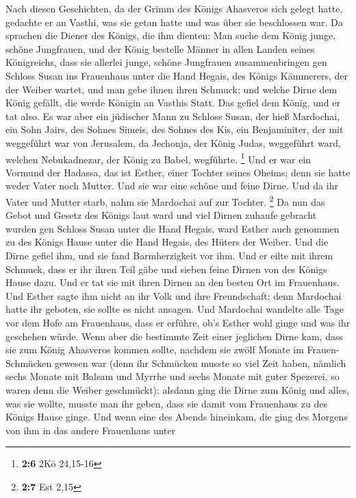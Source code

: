  Nach diesen Geschichten, da der Grimm des Königs Ahasveros
sich gelegt hatte, gedachte er an Vasthi, was sie getan hatte und was
über sie beschlossen war.  Da sprachen die Diener des
Königs, die ihm dienten: Man suche dem König junge, schöne Jungfrauen,
 und der König bestelle Männer in allen Landen seines
Königreichs, dass sie allerlei junge, schöne Jungfrauen zusammenbringen
gen Schloss Susan ins Frauenhaus unter die Hand Hegais, des Königs
Kämmerers, der der Weiber wartet, und man gebe ihnen ihren Schmuck;
 und welche Dirne dem König gefällt, die werde Königin an
Vasthis Statt. Das gefiel dem König, und er tat also.  Es
war aber ein jüdischer Mann zu Schloss Susan, der hieß Mardochai, ein
Sohn Jairs, des Sohnes Simeis, des Sohnes des Kis, ein Benjaminiter,
 der mit weggeführt war von Jerusalem, da Jechonja, der
König Judas, weggeführt ward, welchen Nebukadnezar, der König zu Babel,
wegführte. \footnote{\textbf{2:6} 2Kö 24,15-16}  Und er war
ein Vormund der Hadassa, das ist Esther, einer Tochter seines Oheims;
denn sie hatte weder Vater noch Mutter. Und sie war eine schöne und
feine Dirne. Und da ihr Vater und Mutter starb, nahm sie Mardochai auf
zur Tochter. \footnote{\textbf{2:7} Est 2,15}  Da nun das
Gebot und Gesetz des Königs laut ward und viel Dirnen zuhaufe gebracht
wurden gen Schloss Susan unter die Hand Hegais, ward Esther auch
genommen zu des Königs Hause unter die Hand Hegais, des Hüters der
Weiber.  Und die Dirne gefiel ihm, und sie fand
Barmherzigkeit vor ihm. Und er eilte mit ihrem Schmuck, dass er ihr
ihren Teil gäbe und sieben feine Dirnen von des Königs Hause dazu. Und
er tat sie mit ihren Dirnen an den besten Ort im Frauenhaus.
 Und Esther sagte ihm nicht an ihr Volk und ihre
Freundschaft; denn Mardochai hatte ihr geboten, sie sollte es nicht
ansagen.  Und Mardochai wandelte alle Tage vor dem Hofe am
Frauenhaus, dass er erführe, ob's Esther wohl ginge und was ihr
geschehen würde.  Wenn aber die bestimmte Zeit einer
jeglichen Dirne kam, dass sie zum König Ahasveros kommen sollte, nachdem
sie zwölf Monate im Frauen-Schmücken gewesen war (denn ihr Schmücken
musste so viel Zeit haben, nämlich sechs Monate mit Balsam und Myrrhe
und sechs Monate mit guter Spezerei, so waren denn die Weiber
geschmückt):  alsdann ging die Dirne zum König und alles,
was sie wollte, musste man ihr geben, dass sie damit vom Frauenhaus zu
des Königs Hause ginge.  Und wenn eine des Abends
hineinkam, die ging des Morgens von ihm in das andere Frauenhaus unter
